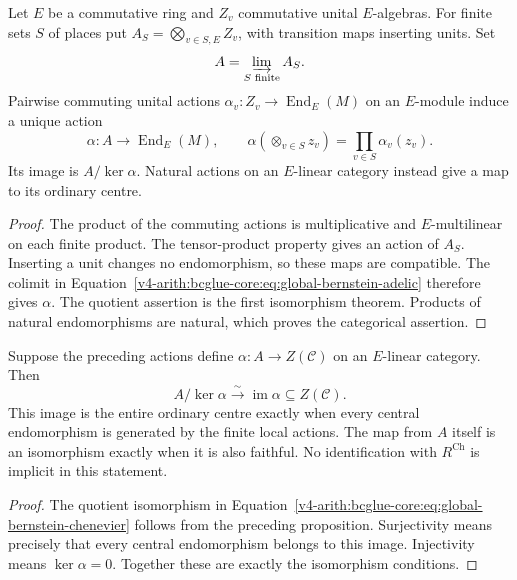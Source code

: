 \begin{proposition}
\label{v4-arith:bcglue-core:thm:colimit-to-global-reduces-to-AG}
Let $E$ be a commutative ring and $Z_v$ commutative unital
$E$-algebras. For finite sets $S$ of places put
$A_S=\bigotimes_{v\in S,E}Z_v$, with transition maps inserting
units. Set
\begin{equation}
\label{v4-arith:bcglue-core:eq:global-bernstein-adelic}
 A=\varinjlim_{S\text{ finite}} A_S.
\end{equation}
Pairwise commuting unital actions
$\alpha_v:Z_v\to\operatorname{End}_E(M)$ on an $E$-module
induce a unique action
\[
 \alpha:A\to\operatorname{End}_E(M),\qquad
 \alpha(\otimes_{v\in S}z_v)=\prod_{v\in S}\alpha_v(z_v).
\]
Its image is $A/\ker\alpha$. Natural actions on an $E$-linear
category instead give a map to its ordinary centre.
\end{proposition}

\begin{proof}
The product of the commuting actions is multiplicative and
$E$-multilinear on each finite product. The tensor-product property
gives an action of $A_S$. Inserting a unit changes no endomorphism,
so these maps are compatible. The colimit in
Equation~\eqref{v4-arith:bcglue-core:eq:global-bernstein-adelic}
therefore gives $\alpha$.
The quotient assertion is the first isomorphism theorem.
Products of natural endomorphisms are natural, which proves the
categorical assertion.
\end{proof}

\begin{proposition}
\label{v4-arith:bcglue-core:thm:global-bernstein-chenevier}
Suppose the preceding actions define
$\alpha:A\to Z(\mathcal C)$ on an $E$-linear category.
Then
\begin{equation}
\label{v4-arith:bcglue-core:eq:global-bernstein-chenevier}
 A/\ker\alpha\xrightarrow{\sim}\operatorname{im}\alpha
       \subseteq Z(\mathcal C).
\end{equation}
This image is the entire ordinary centre exactly when every
central endomorphism is generated by the finite local actions.
The map from $A$ itself is an isomorphism exactly when it is
also faithful. No identification with $R^{\mathrm{Ch}}$ is
implicit in this statement.
\end{proposition}

\begin{proof}
The quotient isomorphism in
Equation~\eqref{v4-arith:bcglue-core:eq:global-bernstein-chenevier}
follows from the preceding proposition.
Surjectivity means precisely that every central endomorphism
belongs to this image. Injectivity means $\ker\alpha=0$.
Together these are exactly the isomorphism conditions.
\end{proof}

